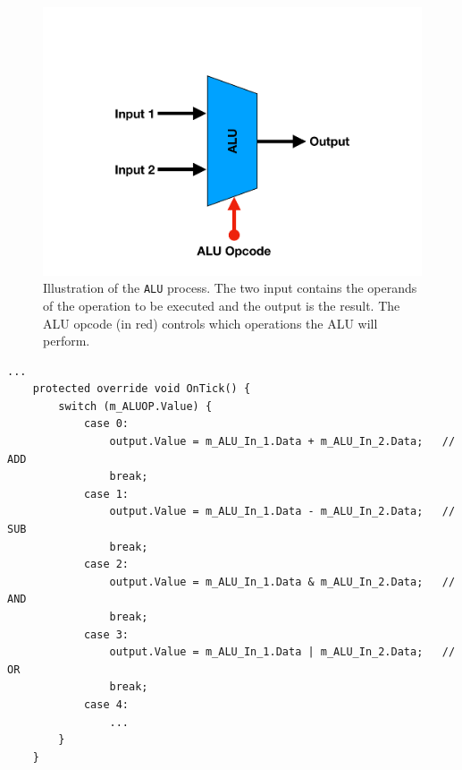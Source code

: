         \begin{figure}[h!]
            \centering
            \includegraphics[scale=0.32]{pictures/ALU.pdf}
            \caption{Illustration of the \texttt{ALU} process. The two input contains the operands of the operation to be executed and the output is the result. The ALU opcode (in red) controls which operations the ALU will perform.}
            \label{fig:ALU}
        \end{figure}
    
        \begin{minipage}{\linewidth}
            \begin{lstlisting}[language={[Sharp]C}, caption={A slice of the \texttt{ALU} process SME code. The ALU consists of a large \texttt{switch} statement, with cases for each operation to be performed, which is controlled by the ALU operation code (\texttt{opcode}). },captionpos=b, label = ALU]
...
    protected override void OnTick() {
        switch (m_ALUOP.Value) {
            case 0:
                output.Value = m_ALU_In_1.Data + m_ALU_In_2.Data;   // ADD
                break;
            case 1:
                output.Value = m_ALU_In_1.Data - m_ALU_In_2.Data;   // SUB
                break;
            case 2:
                output.Value = m_ALU_In_1.Data & m_ALU_In_2.Data;   // AND
                break;
            case 3:
                output.Value = m_ALU_In_1.Data | m_ALU_In_2.Data;   // OR
                break;
            case 4:
                ...
        }
    }
            \end{lstlisting}
        \end{minipage}  
        
